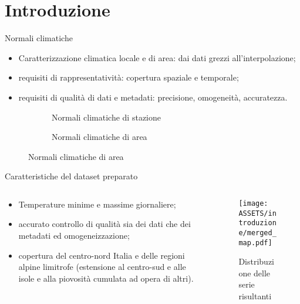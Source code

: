 
\section{Introduzione}
\begin{frame}{Normali climatiche}
  \begin{itemize}
    \item Caratterizzazione climatica locale e di area: dai dati grezzi all'interpolazione;
    \item requisiti di rappresentatività: copertura spaziale e temporale;
    \item requisiti di qualità di dati e metadati: precisione, omogeneità, accuratezza.
  \end{itemize}
  \begin{figure}
    \centering
    \begin{subtable}[m]{0.3\textwidth}
      \centering
      \footnotesize
      
      \caption{Dato meteorologico giornaliero}
    \end{subtable}
    \hfill
    \begin{subfigure}[m]{0.3\textwidth}
      \centering
      
      \caption{Normali climatiche di stazione}
    \end{subfigure}
    \hfill
    \begin{subfigure}[m]{0.3\textwidth}
      
      \caption{Normali climatiche di area}
    \end{subfigure}
  \end{figure}
\end{frame}

\begin{frame}{Caratteristiche del dataset preparato}
  \begin{columns}
    \begin{column}{0.5\textwidth}

      \begin{itemize}
        \item Temperature minime e massime giornaliere;
        \item accurato controllo di qualità sia dei dati che dei metadati ed omogeneizzazione;
        \item copertura del centro-nord Italia e delle regioni alpine limitrofe (estensione al centro-sud e alle isole e alla piovosità cumulata ad opera di altri).
      \end{itemize}
    \end{column}
    \begin{column}{0.5\textwidth}
      \begin{figure}
        \texttt{[image: ASSETS/introduzione/merged\_map.pdf]}
        \caption*{Distribuzione delle serie risultanti}
      \end{figure}

    \end{column}
  \end{columns}
\end{frame}

